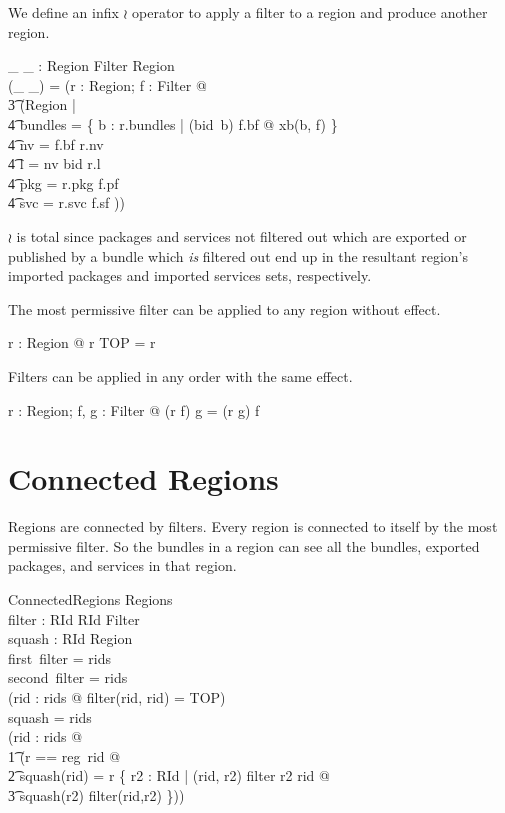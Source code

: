 \documentclass[a4paper,9pt]{article}
\begin{document}
We define an infix $\wr$ operator to apply a filter to a region and produce another region.
\begin{axdef}
  \_ \wr \_ : Region \cross Filter \fun Region \\
\where
  (\_ \wr \_) = (\lambda r : Region;  f : Filter @ \\
\t3   (\mu Region | \\
\t4 bundles = \{ b : r.bundles | (bid~b) \in f.bf @ xb(b, f) \} \land \\
\t4 nv = f.bf \dres r.nv \land \\
\t4 l = nv \circ bid \circ r.l \land \\
\t4 pkg = r.pkg \cap f.pf \land \\
\t4 svc = r.svc \cap f.sf )) \\
\end{axdef}
$\wr$ is total since packages and services not filtered out which are exported or published by a
bundle which \textit{is} filtered out end up
in the resultant region's imported packages and imported services sets, respectively.

The most permissive filter can be applied to any region without effect.
\begin{argue}
  \shows \forall r : Region @ r \wr TOP = r \\
\end{argue}

Filters can be applied in any order with the same effect.
\begin{argue}
  \shows \forall r : Region; f, g : Filter @ (r \wr f) \wr g = (r \wr g) \wr f \\
\end{argue}

\clearpage
\section{Connected Regions}
\label{cha:connregions}

Regions are connected by filters.
Every region is connected to itself by the most permissive filter.
So the bundles in a region can see all the bundles, exported packages, and services in that region.
\begin{schema}{ConnectedRegions}
  Regions \\
  filter : RId \cross RId \pfun Filter \\
  squash : RId \pfun Region \\
\where
  first~\limg \dom filter \rimg = rids \\
  second~\limg \dom filter \rimg = rids \\
  (\forall rid : rids @ filter(rid, rid) = TOP) \\
  \dom squash = rids \\
  (\forall rid : rids @ \\
\t1 (\LET r == reg~rid @ \\
\t2 squash(rid) = r \sqcup \bigsqcup \{ r2 : RId | (rid, r2) \in \dom filter \land r2 \neq rid @ \\
\t3 squash(r2) \wr filter(rid,r2) \}))\\
\end{schema}
\end{document}
